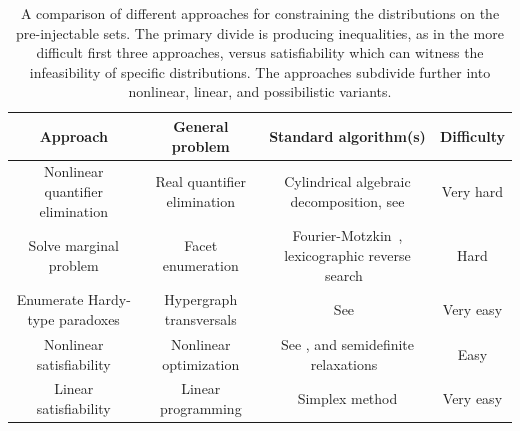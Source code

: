 \begin{table}[ht]\centering\caption{A comparison of different approaches for constraining the distributions on the pre-injectable sets. The primary divide is producing inequalities, as in the more difficult first three approaches, versus satisfiability which can witness the infeasibility of specific distributions. The approaches subdivide further into nonlinear, linear, and possibilistic variants.}
\begin{tabularx}{\linewidth}{ |C|C|C|C| } 
\toprule
Approach & General problem & Standard algorithm(s) & Difficulty \\
\midrule
Nonlinear quantifier elimination & Real quantifier elimination & Cylindrical algebraic decomposition, see \cite{ChavesPolynomial} & Very hard \\
\hline
Solve marginal problem & Facet enumeration & Fourier-Motzkin~\cite{fordan1999projection,DantzigEaves,Bastrakov2015,BalasProjectionCone,Jones2008}, lexicographic reverse search~\cite{Avis2000lrs} & Hard \\
\hline
Enumerate Hardy-type paradoxes & Hypergraph transversals & See~\citet{eiter_dualization_2008} & Very easy \\
\midrule
Nonlinear satisfiability & Nonlinear optimization & See \cite{BarFT-SMTLIB}, and semidefinite relaxations~\cite{laurent_polynomial_2012} & Easy \\
\hline
Linear satisfiability & Linear programming & Simplex method \cite{Korovin2012ImplementingCRA,Bobot2012SimplexSAT} & Very easy \\
\bottomrule
\end{tabularx}
\end{table}


